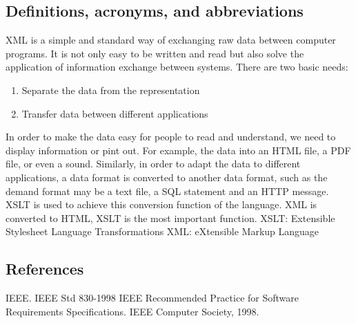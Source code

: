 \subsection{Definitions, acronyms, and abbreviations}
XML is a simple and standard way of exchanging raw data between computer programs.
It is not only easy to be written and read but also solve the application of information exchange between systems. 
There are two basic needs:
\begin{enumerate}
  \item Separate the data from the representation
  \item Transfer data between different applications
\end{enumerate}
In order to make the data easy for people to read and understand, we need to display information or pint out. For example, the data into an HTML file, a PDF file, or even a sound. Similarly, in order to adapt the data to different applications, a data format is converted to another data format, such as the demand format may be a text file, a SQL statement and an HTTP message. XSLT is used to achieve this conversion function of the language. XML is converted to HTML, XSLT is the most important function. 
XSLT: Extensible Stylesheet Language Transformations
XML: eXtensible Markup Language



\subsection{References}
IEEE. IEEE Std 830-1998 IEEE Recommended Practice for Software Requirements Specifications. IEEE Computer Society, 1998.


